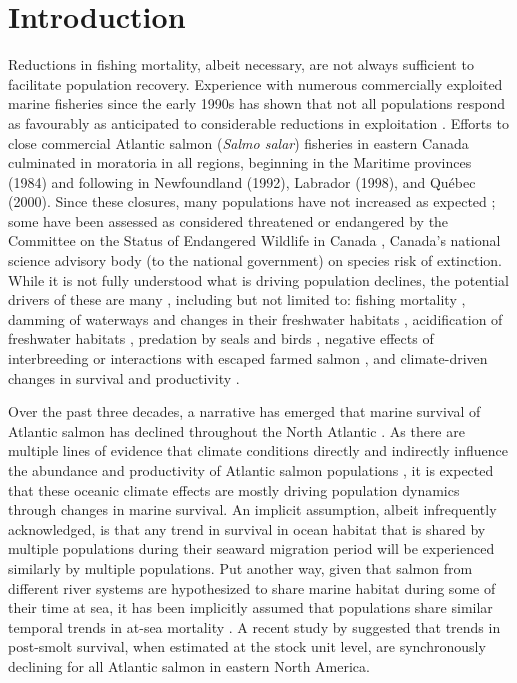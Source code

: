 \documentclass[12pt]{article}
\begin{document}
\section*{Introduction} %


Reductions in fishing mortality, albeit necessary, are not always sufficient
to facilitate population recovery. Experience with numerous commercially
exploited marine fisheries since the early 1990s has shown that not all
populations respond as favourably as anticipated to considerable reductions in
exploitation \citep{Hutchings2017}. Efforts to close commercial
Atlantic salmon (\emph{Salmo salar}) fisheries in eastern Canada culminated in
moratoria in all regions, beginning in the Maritime provinces (1984) and
following in Newfoundland (1992), Labrador (1998), and Qu\'{e}bec (2000). Since
these closures, many populations have not increased as 
expected \citep{Dempson2004, ICES2019}; some 
have been assessed as considered threatened or endangered by the 
Committee on the Status of Endangered Wildlife in Canada \citep[COSEWIC, ][]{Cosewic2010}, 
Canada's national science advisory body (to the national government) on
species risk of extinction.
While it is not fully understood what is driving population declines, the potential
drivers of these are many \citep[see ][for a detailed discussion of possible
causes]{Cairns2001}, including but not limited to: fishing mortality \citep{Dempson2004}, 
damming of waterways and changes in their freshwater habitats \citep{Dunfield1985}, acidification
of freshwater habitats \citep[particularly in the Southern Uplands region of
NS, see][]{Gibson2010}, predation by seals and birds \citep{Cairns2000}, negative
effects of interbreeding or interactions with escaped farmed salmon
\citep{Keyser2018}, and climate-driven changes in survival and productivity \citep{Mills2013}.

Over the past three decades, a narrative has emerged that marine survival of
Atlantic salmon has declined throughout the North Atlantic \citep{ICES2019}.
As there are multiple lines of evidence that climate conditions directly and
indirectly influence the abundance and productivity of Atlantic salmon
populations \citep{Mills2013,Almodovar2019}, it is expected that these oceanic climate effects are mostly
driving population dynamics through changes in marine survival.
An implicit assumption, albeit infrequently acknowledged, is that any trend in
survival in ocean habitat that is shared by multiple populations during their
seaward migration period will be experienced similarly by multiple
populations. Put another way, given that salmon from different river systems
are hypothesized to share marine habitat during some of their time at sea, it
has been implicitly assumed that populations share similar temporal trends in
at-sea mortality \citep{Friedland1993, Friedland1998, Russell2012}.  
A recent study by \citet{Olmos2019} suggested that trends in post-smolt
survival, when estimated at the stock unit level, are synchronously declining
for all Atlantic salmon in eastern North America.
\end{document}
